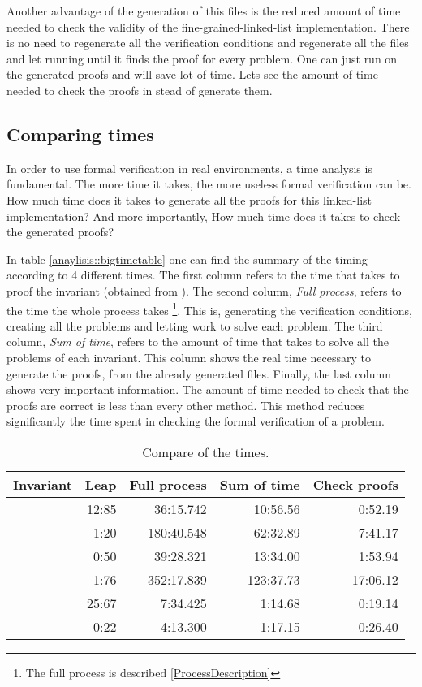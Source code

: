 Another advantage of the generation of this files is the reduced amount of time needed to check the validity of the fine-grained-linked-list implementation. 
%
There is no need to regenerate all the verification conditions and regenerate all the \spass files and let \spass running until it finds the proof for every problem. 
%
One can just run \spass on the generated proofs and will save lot of time.
%
Lets see the amount of time needed to check the proofs in stead of generate them.


\subsection{Comparing times}

In order to use formal verification in real environments, a time analysis is fundamental. 
%
The more time it takes, the more useless formal verification can be.
%
How much time does it takes to generate all the proofs for this linked-list implementation? 
%
And more importantly,  How much time does it takes to check the generated proofs? 

In table \ref{anaylisis::bigtimetable} one can find the summary of the timing according to 4 different times. The first column refers to the time that \leap takes to proof the invariant (obtained from \cite{paperParametrizedInvariants}). 
%
The second column, \textit{Full process}, refers to the time the whole process takes \footnote{The full process is described  \ref{ProcessDescription}}. 
%
This is, generating the verification conditions, creating all the \spass problems and letting \spass work to solve each problem.
%
The third column, \textit{Sum of \spass time}, refers to the amount of time that \spass takes to solve all the problems of each invariant.
%
This column shows the real time necessary to generate the proofs, from the already generated files.
%
Finally, the last column shows very important information.
%
The amount of time needed to check that the proofs are correct is less than every other method. 
%
This method reduces significantly the time spent in checking the formal verification of a problem.


\begin{table}[hbtp]
\centering
\begin{tabular}{r|rrrr}
Invariant 		& Leap 	& Full process 		& Sum of \spass time 	& Check proofs 	\\\hline
\invPreserve 	& 12:85	& 36:15.742			& 10:56.56				& 0:52.19		\\
\invOrder		& 1:20	& 180:40.548		& 62:32.89				& 7:41.17 		\\
\invLock		& 0:50	& 39:28.321			& 13:34.00 				& 1:53.94		\\
\invNext 		& 1:76	& 352:17.839		& 123:37.73				& 17:06.12		\\
\invRegion		& 25:67	& 7:34.425			& 1:14.68				& 0:19.14		\\
\invDisjoint 	& 0:22 	& 4:13.300 			& 1:17.15 				& 0:26.40		\\
\end{tabular}
\caption{Compare of the times.}
\label{anaylsis:bigtimetable}
\end{table}


